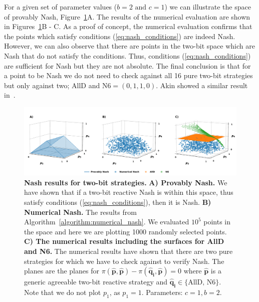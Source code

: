 \documentclass{article}
\theoremstyle{definition}
\begin{document}
For a given set of parameter values (\(b=2 \text{ and } c=1\)) we can illustrate
the space of provably Nash, Figure~\ref{fig:two_bit_reactive_nash_results}A. The
results of the numerical evaluation are shown in
Figures~\ref{fig:two_bit_reactive_nash_results}B - C. As a proof of concept, the
numerical evaluation confirms that the points which satisfy conditions
(\ref{eq:nash_conditions}) are indeed Nash. However, we can also observe
that there are points in the two-bit space which are Nash that do not satisfy
the conditions. Thus, conditions (\ref{eq:nash_conditions}) are sufficient for
Nash but they are not absolute. The final conclusion is that for a point to be Nash
we do not need to check against all 16 pure two-bit strategies but only against
two; AllD and N6\(=(0, 1, 1, 0)\). Akin showed a similar result
in~\citep{akin:EGADS:2016}.


\begin{figure}[!htbp]
     \centering
     \includegraphics[width=\textwidth]{static/two_bit_results.pdf}
     \caption{\textbf{Nash results for two-bit strategies.}
     \textbf{A) Provably Nash.} We have shown that if a two-bit reactive Nash is
     within this space, thus satisfy conditions (\ref{eq:nash_conditions}), then
     it is Nash. \textbf{B) Numerical Nash.} The results from
     Algorithm~\ref{algorithm:numerical_nash}. We evaluated \(10 ^ 5\) points in
     the space and here we are plotting 1000 randomly selected points. \textbf{C)
     The numerical results including the surfaces for AllD and N6.} The
     numerical results have shown that there are two pure strategies for which
     we have to check against to verify Nash. The planes are the planes for
     \(\pi(\mathbf{\hat{p}}, \mathbf{\hat{p}}) - \pi(\mathbf{\hat{q}_i},
     \mathbf{\hat{p}}) = 0\) where \(\mathbf{\hat{p}}\) is a generic agreeable
     two-bit reactive strategy and \(\mathbf{\hat{q}_i} \in \{\text{AllD, N6}\}\).
     Note that we do
     not plot \(p_1\), as \(p_1=1\). Parameters: \(c=1,
     b=2\).}\label{fig:two_bit_reactive_nash_results}
\end{figure}
\end{document}
